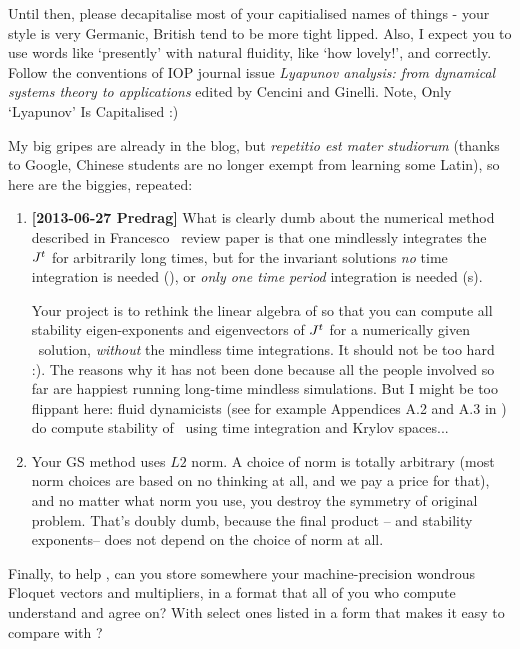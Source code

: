 \begin{description}
Until then, please decapitalise most of your capitialised names of things -
your style is very Germanic, British tend to be more tight lipped. Also, I expect you to use
words like `presently' with natural fluidity, like `how lovely!', and correctly.
Follow the conventions of IOP journal issue {\em Lyapunov analysis: from dynamical systems theory to applications} edited by Cencini and Ginelli. Note, Only `Lyapunov' Is Capitalised :)

My big gripes are already in the blog, but {\em repetitio est mater studiorum}
(thanks to Google, Chinese students are no longer exempt from learning some Latin),
so here are the biggies,  repeated:

\begin{enumerate}
  \item
{\bf[2013-06-27 Predrag]} What is clearly dumb about the numerical
method described in Francesco
    \etal\ review paper is that one mindlessly
    integrates the \jacobianM\  $J^{t}$
for arbitrarily long times, but for the invariant solutions \emph{no}
time integration is needed (\eqva), or \emph{only one time period}
\period{} integration is needed (\po s).

Your project is to rethink the linear algebra of 
so that you can compute all stability eigen-exponents and eigenvectors
of $J^{t}$ for a numerically given \eqv\ solution,
\emph{without} the mindless time integrations.
It should not be too hard :). The reasons why it has not been done
because all the people involved so far are happiest running long-time
mindless simulations.
But I might be too flippant here:
fluid dynamicists (see for example
Appendices 
{A.2 and A.3} in ) do compute stability of \eqva\ using
time integration and Krylov spaces...

  \item
Your GS method uses $L2$ norm. A choice of norm is totally arbitrary (most
norm choices are based on no thinking at all, and we pay a price for that),
and no matter what norm you use, you destroy
the symmetry of original problem. That's doubly dumb, because the final
product --{\cLvs} and stability exponents-- does not depend on
the choice of norm at all.

\end{enumerate}

Finally, to help \XD, can you store somewhere your machine-precision
wondrous Floquet vectors and multipliers, in a format that all of you who
compute understand and agree on? With select ones listed in a form
that makes it easy to compare with ?


\end{description}
